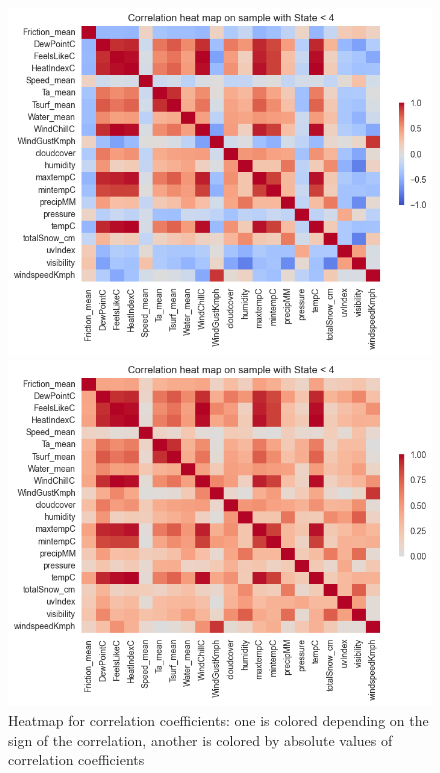 \documentclass[12pt, bachelor, substylefile = algo_title.rtx]{disser}
\theoremstyle{definition}
\begin{document}
\begin{figure}[!h]
   \begin{minipage}{.48\textwidth}
     \includegraphics[width=\linewidth]{heatmap}
   \end{minipage} \hfill
\begin{minipage}{.48\textwidth}
     \includegraphics[width=\linewidth]{heatmap1}
   \end{minipage}
\caption{Heatmap for correlation coefficients: one is colored depending on the sign of the correlation, another is colored by absolute values of correlation coefficients}
\label{fig: 8}
\end{figure}
\end{document}
